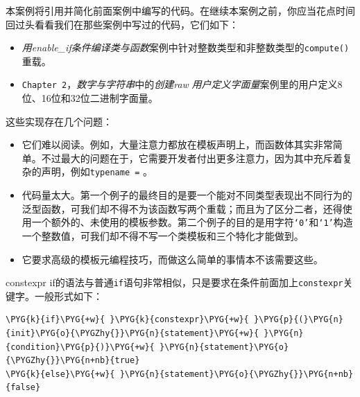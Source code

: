 
本案例将引用并简化前面案例中编写的代码。在继续本案例之前，你应当花点时间回过头看看我们在那些案例中写过的代码，它们如下：



\begin{itemize}
\item \textit{用enable\_if条件编译类与函数}案例中针对整数类型和非整数类型的\texttt{compute()}重载。



\item \texttt{Chapter 2}，\textit{数字与字符串}中的\textit{创建raw} \textit{用户定义字面量}案例里的用户定义8位、16位和32位二进制字面量。

\end{itemize}



这些实现存在几个问题：



\begin{itemize}
\item 它们难以阅读。例如，大量注意力都放在模板声明上，而函数体其实非常简单。不过最大的问题在于，它需要开发者付出更多注意力，因为其中充斥着复杂的声明，例如\texttt{typename =} 。



\item 代码量太大。第一个例子的最终目的是要一个能对不同类型表现出不同行为的泛型函数，可我们却不得不为该函数写两个重载；而且为了区分二者，还得使用一个额外的、未使用的模板参数。第二个例子的目的是用字符\texttt{‘0’}和\texttt{‘1’}构造一个整数值，可我们却不得不写一个类模板和三个特化才能做到。



\item 它要求高级的模板元编程技巧，而做这么简单的事情本不该需要这些。

\end{itemize}



constexpr if的语法与普通\texttt{if}语句非常相似，只是要求在条件前面加上\texttt{constexpr}关键字。一般形式如下：



\begin{codeblockbg}
\begin{Verbatim}[commandchars=\\\{\},breaklines=true,breakanywhere=true,fontsize=\codefont,xleftmargin=17bp]
\PYG{k}{if}\PYG{+w}{ }\PYG{k}{constexpr}\PYG{+w}{ }\PYG{p}{(}\PYG{n}{init}\PYG{o}{\PYGZhy{}}\PYG{n}{statement}\PYG{+w}{ }\PYG{n}{condition}\PYG{p}{)}\PYG{+w}{ }\PYG{n}{statement}\PYG{o}{\PYGZhy{}}\PYG{n+nb}{true}
\PYG{k}{else}\PYG{+w}{ }\PYG{n}{statement}\PYG{o}{\PYGZhy{}}\PYG{n+nb}{false}
\end{Verbatim}
\end{codeblockbg}


